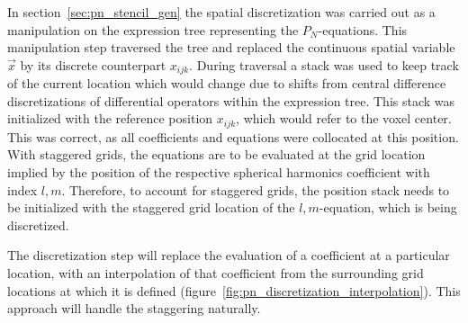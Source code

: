 In section~\ref{sec:pn_stencil_gen} the spatial discretization was carried out as a manipulation on the expression tree representing the $P_N$-equations. This manipulation step traversed the tree and replaced the continuous spatial variable $\vec{x}$ by its discrete counterpart $x_{ijk}$. During traversal a stack was used to keep track of the current location which would change due to shifts from central difference discretizations of differential operators within the expression tree. This stack was initialized with the reference position $x_{ijk}$, which would refer to the voxel center. This was correct, as all coefficients and equations were collocated at this position. With staggered grids, the equations are to be evaluated at the grid location implied by the position of the respective spherical harmonics coefficient with index $l,m$. Therefore, to account for staggered grids, the position stack needs to be initialized with the staggered grid location of the $l,m$-equation, which is being discretized.

The discretization step will replace the evaluation of a coefficient at a particular location, with an interpolation of that coefficient from the surrounding grid locations at which it is defined (figure~\ref{fig:pn_discretization_interpolation}). This approach will handle the staggering naturally.

